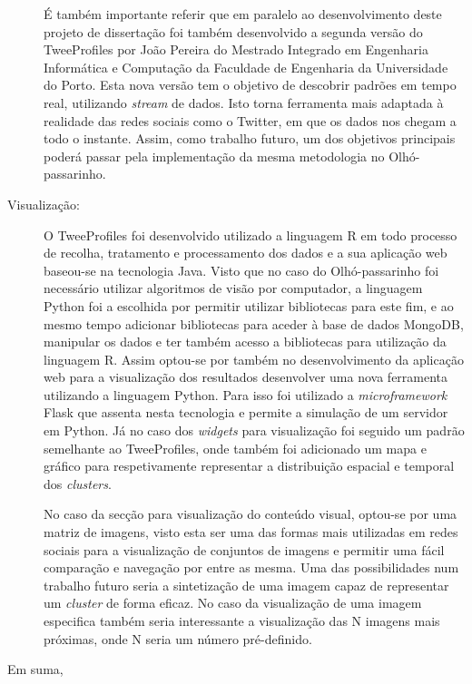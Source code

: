 \begin{description}
É também importante referir que em paralelo ao desenvolvimento deste projeto de dissertação foi também desenvolvido a segunda versão do TweeProfiles por João Pereira do Mestrado Integrado em Engenharia Informática e Computação da Faculdade de Engenharia da Universidade do Porto. Esta nova versão tem o objetivo de descobrir padrões em tempo real, utilizando \textit{stream} de dados. Isto torna ferramenta mais adaptada à realidade das redes sociais como o Twitter, em que os dados nos chegam a todo o instante. Assim, como trabalho futuro, um dos objetivos principais poderá passar pela implementação da mesma metodologia no Olhó-passarinho. 

\item [Visualização:]
O TweeProfiles foi desenvolvido utilizado a linguagem R em todo processo de recolha, tratamento e processamento dos dados e a sua aplicação web baseou-se na tecnologia Java. Visto que no caso do Olhó-passarinho foi necessário utilizar algoritmos de visão por computador, a linguagem Python foi a escolhida por permitir utilizar bibliotecas para este fim, e ao mesmo tempo adicionar bibliotecas para aceder à base de dados MongoDB, manipular os dados e ter também acesso a bibliotecas para utilização da linguagem R. Assim optou-se por também no desenvolvimento da aplicação web para a visualização dos resultados desenvolver uma nova ferramenta utilizando a linguagem Python. Para isso foi utilizado a \textit{microframework} Flask que assenta nesta tecnologia e permite a simulação de um servidor em Python. Já no caso dos \textit{widgets} para visualização foi seguido um padrão semelhante ao TweeProfiles, onde também foi adicionado um mapa e gráfico para respetivamente representar a distribuição espacial e temporal dos \textit{clusters}. 

No caso da secção para visualização do conteúdo visual, optou-se por uma matriz de imagens, visto esta ser uma das formas mais utilizadas em redes sociais para a visualização de conjuntos de imagens e permitir uma fácil comparação e navegação por entre as mesma. 
Uma das possibilidades num trabalho futuro seria a sintetização de uma imagem capaz de representar um \textit{cluster} de forma eficaz. No caso da visualização de uma imagem especifica também seria interessante a visualização das N imagens mais próximas, onde N seria um número pré-definido.

\end{description}

Em suma, 
